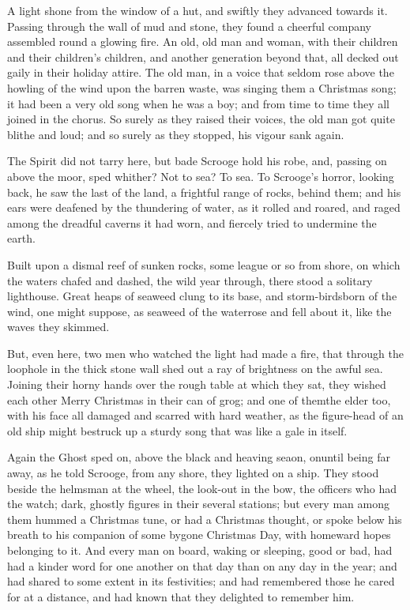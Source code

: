 \documentclass[paper=5.5in:8.5in,BCOR=7mm,twoside,DIV=calc,12pt,usegeometry]{scrbook} %
\begin{document}
A light shone from the window of a hut, and swiftly they advanced towards it. Passing through the wall of mud and stone, they found a cheerful company assembled round a glowing fire. An old, old man and woman, with their children and their children's children, and another generation beyond that, all decked out gaily in their holiday attire. The old man, in a voice that seldom rose above the howling of the wind upon the barren waste, was singing them a Christmas song; it had been a very old song when he was a boy; and from time to time they all joined in the chorus. So surely as they raised their voices, the old man got quite blithe and loud; and so surely as they stopped, his vigour sank again.

The Spirit did not tarry here, but bade Scrooge hold his robe, and, passing on above the moor, sped whither? Not to sea? To sea. To Scrooge's horror, looking back, he saw the last of the land, a frightful range of rocks, behind them; and his ears were deafened by the thundering of water, as it rolled and roared, and raged among the dreadful caverns it had worn, and fiercely tried to undermine the earth.

Built upon a dismal reef of sunken rocks, some league or so from shore, on which the waters chafed and dashed, the wild year through, there stood a solitary lighthouse. Great heaps of seaweed clung to its base, and storm-birds\textemdash born of the wind, one might suppose, as seaweed of the water\textemdash rose and fell about it, like the waves they skimmed.

But, even here, two men who watched the light had made a fire, that through the loophole in the thick stone wall shed out a ray of brightness on the awful sea. Joining their horny hands over the rough table at which they sat, they wished each other Merry Christmas in their can of grog; and one of them\textemdash the elder too, with his face all damaged and scarred with hard weather, as the figure-head of an old ship might be\textemdash struck up a sturdy song that was like a gale in itself.

Again the Ghost sped on, above the black and heaving sea\textemdash on, on\textemdash until being far away, as he told Scrooge, from any shore, they lighted on a ship. They stood beside the helmsman at the wheel, the look-out in the bow, the officers who had the watch; dark, ghostly figures in their several stations; but every man among them hummed a Christmas tune, or had a Christmas thought, or spoke below his breath to his companion of some bygone Christmas Day, with homeward hopes belonging to it. And every man on board, waking or sleeping, good or bad, had had a kinder word for one another on that day than on any day in the year; and had shared to some extent in its festivities; and had remembered those he cared for at a distance, and had known that they delighted to remember him.
\end{document}
